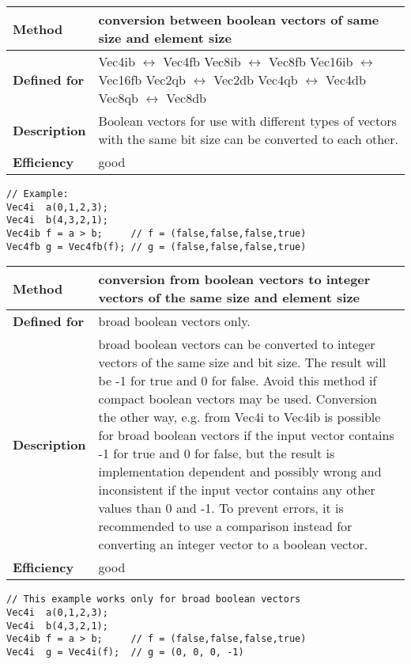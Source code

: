 \documentclass[vcl_manual.tex]{subfiles}
\begin{document}
\begin{tabular}{|p{30mm}|p{120mm}|}
\hline
\bfseries Method & conversion between boolean vectors of same size and element size \\ \hline
\bfseries Defined for & 
Vec4ib $\leftrightarrow$ Vec4fb \newline
Vec8ib $\leftrightarrow$ Vec8fb \newline
Vec16ib $\leftrightarrow$ Vec16fb \newline
Vec2qb $\leftrightarrow$ Vec2db \newline
Vec4qb $\leftrightarrow$ Vec4db \newline
Vec8qb $\leftrightarrow$ Vec8db \\ \hline
\bfseries Description & Boolean vectors for use with different types of vectors with the same bit size can be converted to each other. \\ \hline
\bfseries Efficiency & good \\ \hline
\end{tabular}
\begin{lstlisting}[frame=none]
// Example:
Vec4i  a(0,1,2,3);
Vec4i  b(4,3,2,1);
Vec4ib f = a > b;     // f = (false,false,false,true)
Vec4fb g = Vec4fb(f); // g = (false,false,false,true)
\end{lstlisting}


\begin{tabular}{|p{30mm}|p{120mm}|}
\hline
\bfseries Method & conversion from boolean vectors to integer vectors of the same size and element size \\ \hline
\bfseries Defined for & broad boolean vectors only.  \\ \hline
\bfseries Description & broad boolean vectors can be converted to integer vectors of the same size and bit size. The result will be -1 for true and 0 for false.\newline
Avoid this method if compact boolean vectors may be used.\newline
Conversion the other way, e.g. from Vec4i to Vec4ib is possible for broad boolean vectors
 if the input vector contains -1 for true and 0 for false, but the result is implementation dependent and possibly wrong and inconsistent if the input vector contains any other values than 0 and -1. To prevent errors, it is recommended to use a comparison instead for converting an integer vector to a boolean vector.  \\ \hline
\bfseries Efficiency & good \\ \hline
\end{tabular}
\begin{lstlisting}[frame=none]
// This example works only for broad boolean vectors
Vec4i  a(0,1,2,3);
Vec4i  b(4,3,2,1);
Vec4ib f = a > b;     // f = (false,false,false,true)
Vec4i  g = Vec4i(f);  // g = (0, 0, 0, -1)
\end{lstlisting}
\end{document}
